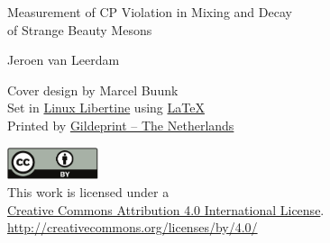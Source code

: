 \thispagestyle{empty}
\begin{center}

  {\Large
  Measurement of CP Violation in Mixing and Decay\\
  of Strange Beauty Mesons}




  {\large
  Jeroen van Leerdam}

\end{center}

\newpage
\thispagestyle{empty}

\begin{center}
  Cover design by Marcel Buunk \\

  Set in \href{http://www.linuxlibertine.org/}{Linux Libertine} using \href{https://latex-project.org/}{\LaTeX} \\
  Printed by \href{http://www.gildeprint.nl/}{Gildeprint -- The Netherlands}\\


  \href{http://creativecommons.org/licenses/by/4.0/}{\includegraphics[width=0.2\textwidth]{graphics/title/cc_by_cmyk}}\\
  This work is licensed under a\\
  \href{http://creativecommons.org/licenses/by/4.0/}{Creative Commons Attribution 4.0 International License}.\\
  \href{http://creativecommons.org/licenses/by/4.0/}{http://creativecommons.org/licenses/by/4.0/}

\end{center}


